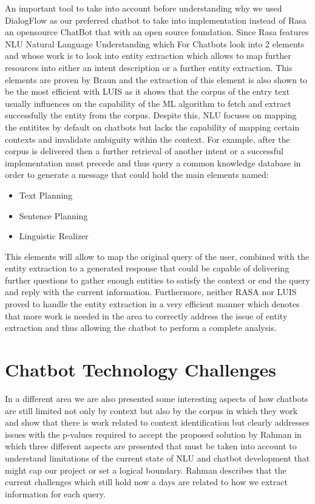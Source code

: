 An important tool to take into account before understanding why we used DialogFlow as our preferred chatbot to take into implementation instead of Rasa an opensource ChatBot that with an open source foundation. Since Rasa features NLU Natural Language Understanding which For Chatbots look into 2 elements and whose work is to look into entity extraction which allows to map further resources into either an intent description or a further entity extraction. This elements are proven by Braun \cite{nlu_complete} and the extraction of this element is also shown to be the most efficient with LUIS \cite{nlu_complete} as it shows that the corpus of the entry text usually influences on the capability of the ML algorithm to fetch and extract successfully the entity from the corpus. Despite this, NLU focuses on mapping the entitites by default on chatbots but lacks the capability of mapping certain contexts and invalidate ambiguity within the context. For example, after the corpus is delivered then a further retrieval of another intent or a successful implementation must precede and thus query a common knowledge database in order to generate a message that could hold the main elements named:

\begin{itemize}
    \item Text Planning
    \item Sentence Planning
    \item Linguistic Realizer
\end{itemize}

This elements will allow to map the original query of the user, combined with the entity extraction to a generated response that could be capable of delivering further questions to gather enough entities to satisfy the context or end the query and reply with the current information. Furthermore, neither RASA nor LUIS proved to handle the entity extraction in a very efficient manner which denotes that more work is needed in the area to correctly address the issue of entity extraction and thus allowing the chatbot to perform a complete analysis.

\section{Chatbot Technology Challenges}

In a different area we are also presented some interesting aspects of how chatbots are still limited not only by context but also by the corpus in which they work and show that there is work related to context identification but clearly addresses issues with the p-values required to accept the proposed solution by Rahman \cite{chatbot_challenges} in which three different aspects are presented that must be taken into account to understand limitations of the current state of NLU and chatbot development that might cap our project or set a logical boundary. Rahman describes that the current challenges which still hold now a days are related to how we extract information for each query. 

